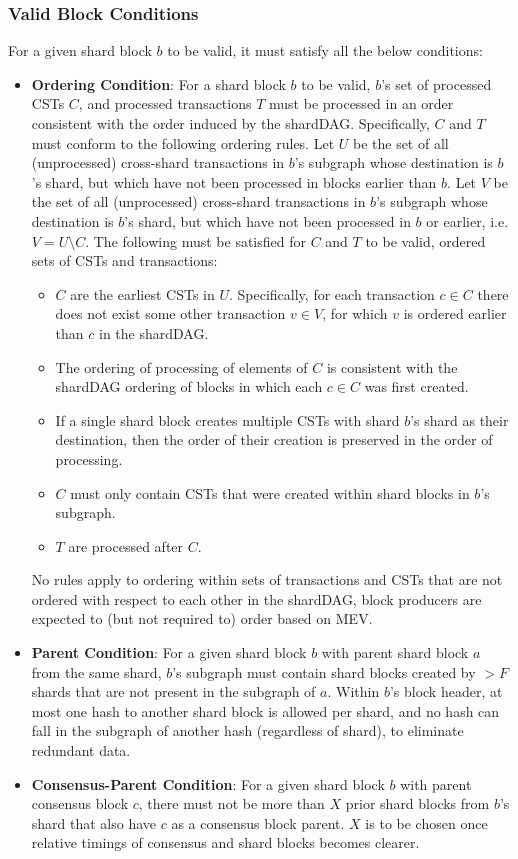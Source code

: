 \subsubsection{Valid Block Conditions}
For a given shard block $b$ to be valid, it must satisfy all the below conditions:
\begin{itemize}
	\item \textbf{Ordering Condition}: For a shard block $b$ to be valid, $b$'s set of processed CSTs $C$, and processed transactions $T$ must be processed in an order consistent with the order induced by the shardDAG. Specifically, $C$ and $T$ must conform to the following ordering rules. 
	Let $U$ be the set of all (unprocessed) cross-shard transactions in $b$’s subgraph whose destination is $b$'s shard, but which have not been processed in blocks earlier than $b$. 
	Let $V$ be the set of all (unprocessed) cross-shard transactions in $b$’s subgraph whose destination is $b$'s shard, but which have not been processed in $b$ or earlier, i.e. $V=U\setminus C$. 
	The following must be satisfied for $C$ and $T$ to be valid, ordered sets of CSTs and transactions:
	\begin{itemize}
		\item $C$ are the earliest CSTs in $U$. Specifically, for each transaction $c \in C$ there does not exist some other transaction $v \in V$, for which $v$ is ordered earlier than $c$ in the shardDAG.
		\item The ordering of processing of elements of $C$ is consistent with the shardDAG ordering of blocks in which each $c\in C$ was first created.
		\item If a single shard block creates multiple CSTs with shard $b$'s shard as their destination, then the order of their creation is preserved in the order of processing.
		\item $C$ must only contain CSTs that were created within shard blocks in $b$'s subgraph.
		\item $T$ are processed after $C$.
	\end{itemize}
	No rules apply to ordering within sets of transactions and CSTs that are not ordered with respect to each other in the shardDAG, block producers are expected to (but not required to) order based on MEV. 
	
	\item \textbf{Parent Condition}: For a given shard block $b$ with parent shard block $a$ from the same shard, $b$’s subgraph must contain shard blocks created by $>F$ shards that are not present in the subgraph of $a$. 
	Within $b$'s block header, at most one hash to another shard block is allowed per shard, and no hash can fall in the subgraph of another hash (regardless of shard), to eliminate redundant data.
	\item \textbf{Consensus-Parent Condition}: For a given shard block $b$ with parent consensus block $c$, there must not be more than $X$ prior shard blocks from $b$’s shard that also have $c$ as a consensus block parent. 
	$X$ is to be chosen once relative timings of consensus and shard blocks becomes clearer.
\end{itemize}
